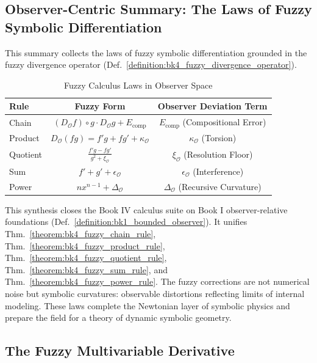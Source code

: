 \subsection{Observer-Centric Summary: The Laws of Fuzzy Symbolic Differentiation}
\label{subsec:bk4_fuzzy_differentiation_summary}

This summary collects the laws of fuzzy symbolic differentiation grounded in the fuzzy divergence operator (Def.~\ref{definition:bk4_fuzzy_divergence_operator}).

\begin{table}[ht!]
\centering
\begin{tabular}{|l|c|c|}
\hline
\textbf{Rule} & \textbf{Fuzzy Form} & \textbf{Observer Deviation Term} \\
\hline
Chain & $(D_{\mathcal{O}} f) \circ g \cdot D_{\mathcal{O}} g + E_{\text{comp}}$ & $E_{\text{comp}}$ (Compositional Error) \\
Product & $D_{\mathcal{O}}(fg) = f' g + f g' + \kappa_{\mathcal{O}}$ & $\kappa_{\mathcal{O}}$ (Torsion) \\
Quotient & $\frac{f'g - fg'}{g^2 + \xi_{\mathcal{O}}}$ & $\xi_{\mathcal{O}}$ (Resolution Floor) \\
Sum & $f' + g' + \epsilon_{\mathcal{O}}$ & $\epsilon_{\mathcal{O}}$ (Interference) \\
Power & $n x^{n-1} + \Delta_{\mathcal{O}}$ & $\Delta_{\mathcal{O}}$ (Recursive Curvature) \\
\hline
\end{tabular}
\caption{Fuzzy Calculus Laws in Observer Space}
\end{table}

\begin{scholium}
\label{scholium:bk4_reflexive_physics_emergence}
This synthesis closes the Book IV calculus suite on Book I
observer-relative foundations (Def.~\ref{definition:bk1_bounded_observer}).
It unifies Thm.~\ref{theorem:bk4_fuzzy_chain_rule},
Thm.~\ref{theorem:bk4_fuzzy_product_rule},
Thm.~\ref{theorem:bk4_fuzzy_quotient_rule},
Thm.~\ref{theorem:bk4_fuzzy_sum_rule}, and
Thm.~\ref{theorem:bk4_fuzzy_power_rule}.
The fuzzy corrections are not numerical noise but symbolic curvatures:
observable distortions reflecting limits of internal modeling.
These laws complete the Newtonian layer of symbolic physics and prepare the
field for a theory of dynamic symbolic geometry.
\end{scholium}

\subsection[The Fuzzy Multivariable Derivative]{The Fuzzy Multivariable Derivative}
\label{subsec:bk4_fuzzy_multivar_derivative}

